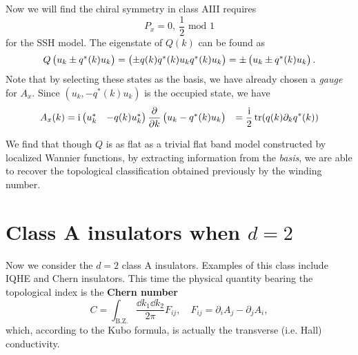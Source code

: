 \documentclass[hyperref, a4paper]{article}
\newcommand*{\ii}{\mathrm{i}}
\newcommand*{\concept}[1]{{\textbf{#1}}}
\def\\{}%
\begin{document}
Now we will find the chiral symmetry in class AIII requires 
\begin{equation}
    P_x = 0, \  \frac{1}{2} \text{ mod 1}
\end{equation}
for the SSH model. The eigenstate of $Q(k)$ can be found as 
\begin{equation}
    Q \pmqty{u_k \\ \pm q^*(k) u_k } = \pmqty{\pm q(k) q^*(k) u_k \\ q^*(k) u_k} = \pm \pmqty{u_k \\ \pm q^*(k) u_k }.
\end{equation}
Note that by selecting these states as the basis, we have already chosen a \emph{gauge} for $A_x$. 
Since $(u_k, - q^*(k) u_k)$ is the occupied state, we have 
\begin{equation}
    \begin{aligned}
        A_x(k) &= \ii \pmqty{u^*_k & - q(k) u_k^*} \pdv{k} \pmqty{u_k \\ - q^*(k) u_k}  \\
        &= \frac{\ii}{2} \trace (q(k) \partial_k q^*(k)) 
    \end{aligned}
\end{equation}

We find that though $Q$ is as flat as a trivial flat band model constructed by localized Wannier functions, 
by extracting information from the \emph{basis}, we are able to recover the topological classification obtained 
previously by the winding number.

\section{Class A insulators when $d=2$}

Now we consider the $d=2$ class A insulators. Examples of this class include IQHE and Chern insulators.
This time the physical quantity bearing the topological index is the \concept{Chern number}
\begin{equation}
    C = \int_\text{B.Z.} \frac{\dd{k_1} \dd{k_2}}{2 \pi} F_{ij}, \quad F_{ij} = \partial_i A_j - \partial_j A_i,
\end{equation}
which, according to the Kubo formula, is actually the transverse (i.e. Hall) conductivity. 





\end{document}
